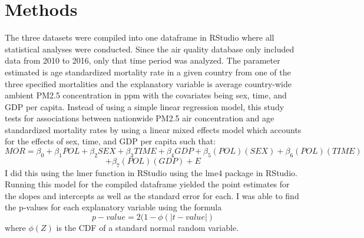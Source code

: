 \documentclass[12pt, letterpaper, twoside]{article}\usepackage[]{graphicx}\usepackage[]{xcolor}
\begin{document}
\section*{Methods}
The three datasets were compiled into one dataframe in RStudio where all
statistical analyses were conducted. Since the air quality database only included
data from 2010 to 2016, only that time period was analyzed. The parameter estimated
is age standardized mortality rate in a given country from one of the three
specified mortalities and the explanatory variable is average country-wide
ambient PM2.5 concentration in ppm with the covariates being sex, time, and GDP
per capita. Instead of using a simple linear regression model, this study tests
for associations between nationwide PM2.5 air concentration and age standardized
mortality rates by using a linear mixed effects model which accounts for the
effects of sex, time, and GDP per capita such that:
\[
  MOR = \beta_{0} + \beta_{1}POL + \beta_{2}SEX + \beta_{3}TIME +\beta_{4}GDP
  + \beta_{5}(POL)(SEX) + \beta_{6}(POL)(TIME)
\]
\[
 + \beta_{7}(POL)(GDP) + E
\]
I did this using the lmer function in RStudio using the lme4 package in RStudio.
Running this model for the compiled dataframe yielded the point estimates for
the slopes and intercepts as well as the standard error for each. I was able to
find the p-values for each explanatory variable using the formula
\[
  p-value = 2(1 - \phi(|t-value|)
\]
where \begin{math}\phi(Z)\end{math} is the CDF of a standard normal random
variable.
\end{document}
